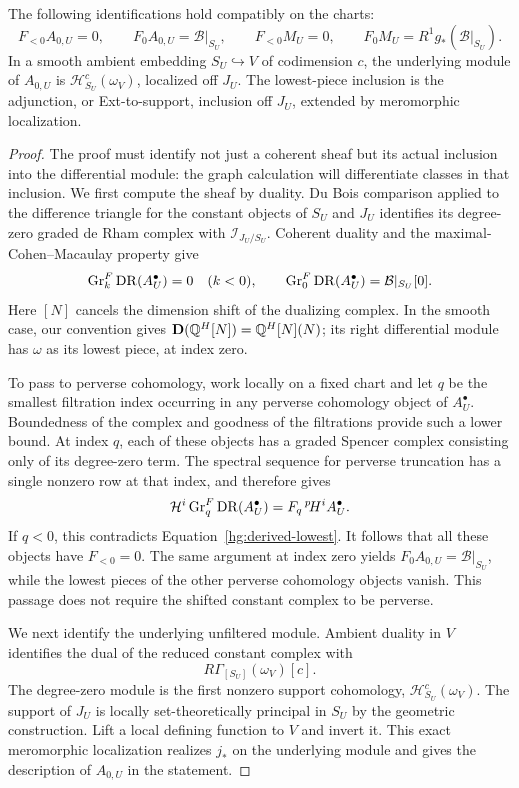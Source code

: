 \begin{lemma}\label{hg:lowest-piece}
The following identifications hold compatibly on the charts:
\[
 F_{<0}A_{0,U}=0,\qquad F_0A_{0,U}=\mathcal B|_{S_U},
 \qquad
 F_{<0}M_U=0,\qquad
 F_0M_U=R^1g_*(\mathcal B|_{S_U}).
\]
In a smooth ambient embedding \(S_U\hookrightarrow V\) of
codimension \(c\), the underlying module of \(A_{0,U}\) is
\(\mathcal H^c_{S_U}(\omega_V)\), localized off \(J_U\).
The lowest-piece inclusion is the adjunction, or Ext-to-support,
inclusion off \(J_U\), extended by meromorphic localization.
\end{lemma}

\begin{proof}
The proof must identify not just a coherent sheaf but its actual
inclusion into the differential module: the graph calculation
will differentiate classes in that inclusion.  We first compute
the sheaf by duality.  Du Bois
comparison applied to the difference triangle for the constant
objects of \(S_U\) and \(J_U\) identifies its degree-zero
graded de Rham complex with \(\mathcal I_{J_U/S_U}\).
Coherent duality and the maximal-Cohen--Macaulay property give
\begin{equation}\label{hg:derived-lowest}
 \operatorname{Gr}^F_k\operatorname{DR}(A^\bullet_U)=0\quad(k<0),
 \qquad
 \operatorname{Gr}^F_0\operatorname{DR}(A^\bullet_U)=\mathcal B|_{S_U}[0].
\end{equation}
Here \([N]\) cancels the dimension shift of the dualizing
complex.  In the smooth case, our convention gives
\(\mathbf D(\mathbb{Q}^H[N])=\mathbb{Q}^H[N](N)\); its right differential module
has \(\omega\) as its lowest piece, at index zero.

To pass to perverse cohomology, work locally on a fixed chart
and let \(q\) be the smallest filtration index occurring in any
perverse cohomology object of \(A^\bullet_U\).  Boundedness of
the complex and goodness of the filtrations provide such a lower
bound.  At index \(q\), each of these objects has a graded
Spencer complex consisting only of its degree-zero term.  The
spectral sequence for perverse truncation has a single nonzero
row at that index, and therefore gives
\[
 \mathcal H^i\operatorname{Gr}^F_q\operatorname{DR}(A^\bullet_U)
   =F_q\,{}^p\!H^iA^\bullet_U.
\]
If \(q<0\), this contradicts Equation~\eqref{hg:derived-lowest}.
It follows that all these objects have \(F_{<0}=0\).  The same
argument at index zero yields
\(F_0A_{0,U}=\mathcal B|_{S_U}\), while the lowest pieces of
the other perverse cohomology objects vanish.  This passage
does not require the shifted constant complex to be perverse.

We next identify the underlying unfiltered module.  Ambient duality in \(V\)
identifies the dual of the reduced constant complex with
\[
 R\Gamma_{[S_U]}(\omega_V)[c].
\]
The degree-zero module is the first nonzero support cohomology,
\(\mathcal H^c_{S_U}(\omega_V)\).  The support of \(J_U\) is locally
set-theoretically principal in \(S_U\) by the geometric
construction.  Lift a local defining function to \(V\) and
invert it.  This exact meromorphic localization realizes
\(j_*\) on the underlying module and gives the description
of \(A_{0,U}\) in the statement.


\end{proof}
